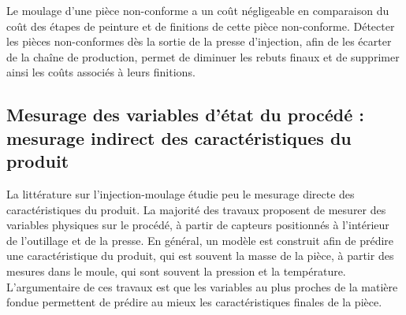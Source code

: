 Le moulage d'une pièce non-conforme a un coût négligeable en comparaison du coût des étapes de peinture et de finitions de cette pièce non-conforme.
Détecter les pièces non-conformes dès la sortie de la presse d’injection, afin de les écarter de la chaîne de production, permet de diminuer les rebuts finaux et de supprimer ainsi les coûts associés à leurs finitions.


\subsection{Mesurage des variables d'état du procédé : mesurage indirect des caractéristiques du produit} \label{subsec:indirect_measures}
La littérature sur l'injection-moulage étudie peu le mesurage directe des caractéristiques du produit.
La majorité des travaux proposent de mesurer des variables physiques sur le procédé, à partir de capteurs positionnés à l'intérieur de l'outillage et de la presse.
En général, un modèle est construit afin de prédire une caractéristique du produit, qui est souvent la masse de la pièce, à partir des mesures dans le moule, qui sont souvent la pression et la température.
L'argumentaire de ces travaux est que les variables au plus proches de la matière fondue permettent de prédire au mieux les caractéristiques finales de la pièce.


